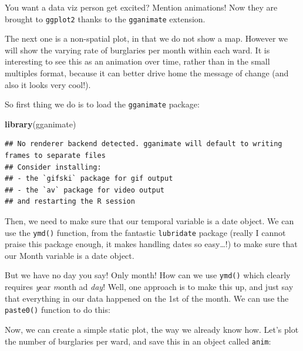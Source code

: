 \documentclass[]{book}
\newenvironment{Shaded}{\begin{snugshade}}{\end{snugshade}}
\newcommand{\KeywordTok}[1]{\textcolor[rgb]{0.13,0.29,0.53}{\textbf{#1}}}
\newcommand{\NormalTok}[1]{#1}
\newcommand{\OperatorTok}[1]{\textcolor[rgb]{0.81,0.36,0.00}{\textbf{#1}}}
\newcommand{\StringTok}[1]{\textcolor[rgb]{0.31,0.60,0.02}{#1}}
\begin{document}
You want a data viz person get excited? Mention animations! Now they are brought to \texttt{ggplot2} thanks to the \texttt{gganimate} extension.

The next one is a non-spatial plot, in that we do not show a map. However we will show the varying rate of burglaries per month within each ward. It is interesting to see this as an animation over time, rather than in the small multiples format, because it can better drive home the message of change (and also it looks very cool!).

So first thing we do is to load the \texttt{gganimate} package:

\begin{Shaded}
\begin{Highlighting}[]
\KeywordTok{library}\NormalTok{(gganimate)}
\end{Highlighting}
\end{Shaded}

\begin{verbatim}
## No renderer backend detected. gganimate will default to writing frames to separate files
## Consider installing:
## - the `gifski` package for gif output
## - the `av` package for video output
## and restarting the R session
\end{verbatim}

Then, we need to make sure that our temporal variable is a date object. We can use the \texttt{ymd()} function, from the fantastic \texttt{lubridate} package (really I cannot praise this package enough, it makes handling dates so easy\ldots{}!) to make sure that our Month variable is a date object.

But we have no day you say! Only month! How can we use \texttt{ymd()} which clearly requires \emph{y}ear \emph{m}onth ad \emph{day}! Well, one approach is to make this up, and just say that everything in our data happened on the 1st of the month. We can use the \texttt{paste0()} function to do this:

\begin{Shaded}
\end{Shaded}

Now, we can create a simple static plot, the way we already know how. Let's plot the number of burglaries per ward, and save this in an object called \texttt{anim}:
\end{document}
